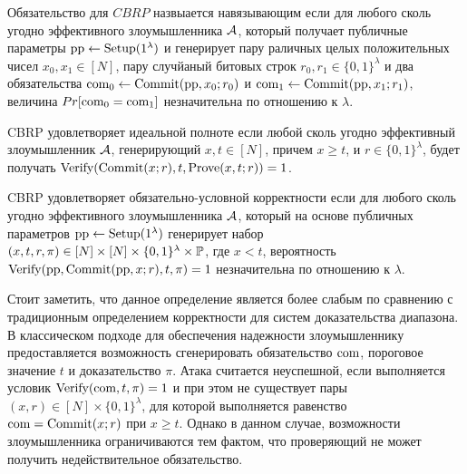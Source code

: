 
\begin{definition}
	Обязательство для $CBRP$ назвыается навязывающим если для любого сколь угодно эффективного злоумышленника $\A$, который получает публичные параметры $\pp \leftarrow \Setup(1^\lambda)$ и генерирует пару раличных целых положительных чисел $x_0, x_1 \in [N]$, пару случйаный битовых строк $r_0, r_1 \in \{0, 1\}^\lambda$ и два обязательства $\com_0 \leftarrow \Commit(\pp, x_0; r_0)$ и $\com_1 \leftarrow \Commit(\pp, x_1; r_1)$, величина $Pr[\com_0 = \com_1]$ незначительна по отношению к $\lambda$.
\end{definition}

\begin{definition}
	CBRP удовлетворяет идеальной полноте если любой сколь угодно эффективный злоумышленник $\A$, генерирующий $x, t \in [N]$, причем  $x \geq t$, и $r \in \{0, 1\}^\lambda$, будет получать $\Verify(\Commit(x; r), t, \Prove(x, t; r)) = 1$.
\end{definition}

\begin{definition}
	CBRP удовлетворяет обязательно-условной корректности если для любого сколь угодно эффективного злоумышленника $\A$, который на основе публичных параметров $\pp \leftarrow \Setup(1^\lambda)$ генерирует набор $(x, t, r, \pi) \in [N] \times [N] \times \{0, 1\}^\lambda \times \P$, где $x < t$, вероятность $\Verify(\pp, \Commit(\pp, x; r), t, \pi) = 1$ незначительна по отношению к $\lambda$.
\end{definition}

Стоит заметить, что данное определение является более слабым по сравнению с традиционным определением корректности для систем доказательства диапазона.
В классическом подходе для обеспечения надежности злоумышленнику предоставляется возможность сгенерировать обязательство $\com$, пороговое значение $t$ и доказательство $\pi$.
Атака считается неуспешной, если выполняется условик $\Verify(\com, t, \pi) = 1$ и при этом не существует пары $(x, r) \in [N] \times \{0, 1\}^\lambda$, для которой выполняется равенство $\com = \Commit(x; r)$ при $x \geq t$.
Однако в данном случае, возможности злоумышленника ограничиваются тем фактом, что проверяющий не может получить недействительное обязательство.

